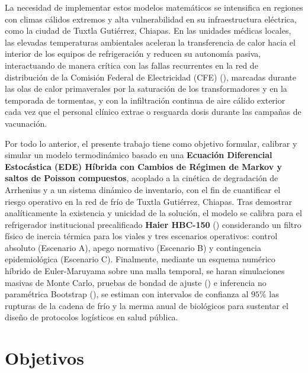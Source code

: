 \documentclass[
  spanish,
  us-letterpaper,
]{scrreprt}
\numberwithin{equation}{section}
\theoremstyle{plain}
\theoremstyle{plain}
\theoremstyle{definition}
\theoremstyle{plain}
\theoremstyle{remark}
\begin{document}
La necesidad de implementar estos modelos matemáticos se intensifica en
regiones con climas cálidos extremos y alta vulnerabilidad en su
infraestructura eléctrica, como la ciudad de Tuxtla Gutiérrez, Chiapas.
En las unidades médicas locales, las elevadas temperaturas ambientales
aceleran la transferencia de calor hacia el interior de los equipos de
refrigeración y reducen su autonomía pasiva, interactuando de manera
crítica con las fallas recurrentes en la red de distribución de la
Comisión Federal de Electricidad (CFE)
(),
marcadas durante las olas de calor primaverales por la saturación de los
transformadores y en la temporada de tormentas, y con la infiltración
continua de aire cálido exterior cada vez que el personal clínico extrae
o resguarda dosis durante las campañas de vacunación.

Por todo lo anterior, el presente trabajo tiene como objetivo formular,
calibrar y simular un modelo termodinámico basado en una
\textbf{Ecuación Diferencial Estocástica (EDE) Híbrida con Cambios de
Régimen de Markov y saltos de Poisson compuestos}, acoplado a la
cinética de degradación de Arrhenius y a un sistema dinámico de
inventario, con el fin de cuantificar el riesgo operativo en la red de
frío de Tuxtla Gutiérrez, Chiapas. Tras demostrar analíticamente la
existencia y unicidad de la solución, el modelo se calibra para el
refrigerador institucional precalificado \textbf{Haier HBC-150}
()
considerando un filtro físico de inercia térmica para los viales y tres
escenarios operativos: control absoluto (Escenario A), apego normativo
(Escenario B) y contingencia epidemiológica (Escenario C). Finalmente,
mediante un esquema numérico híbrido de Euler-Maruyama sobre una malla
temporal, se haran simulaciones masivas de Monte Carlo, pruebas de
bondad de ajuste () e inferencia no paramétrica Bootstrap
(), se
estiman con intervalos de confianza al \(95\%\) las rupturas de la
cadena de frío y la merma anual de biológicos para sustentar el diseño
de protocolos logísticos en salud pública.


\chapter{Objetivos}\label{objetivos}
\end{document}
